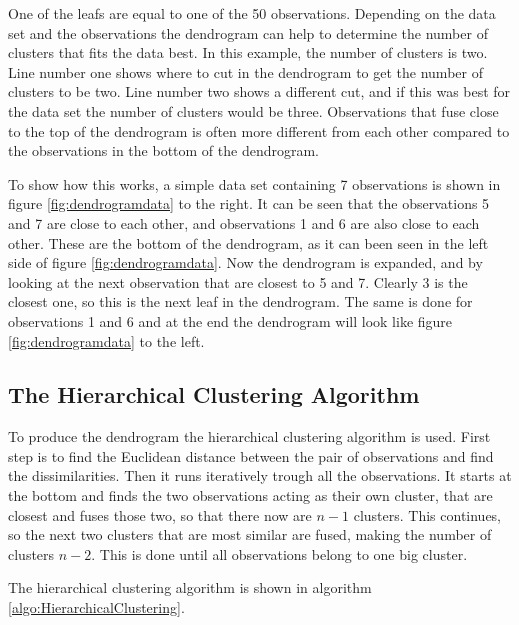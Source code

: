 One of the leafs are equal to one of the 50 observations. 
Depending on the data set and the observations the dendrogram can help to determine the number of clusters that fits the data best. In this example, the number of clusters is two. Line number one shows where to cut in the dendrogram to get the number of clusters to be two. Line number two shows a different cut, and if this was best for the data set the number of clusters would be three.
Observations that fuse close to the top of the dendrogram is often more different from each other compared to the observations in the bottom of the dendrogram. 


\FloatBarrier
To show how this works, a simple data set containing 7 observations is shown in figure \ref{fig:dendrogramdata} to the right.
It can be seen that the observations 5 and 7 are close to each other, and observations 1 and 6 are also close to each other. These are the bottom of the dendrogram, as it can been seen in the left side of figure \ref{fig:dendrogramdata}. Now the dendrogram is expanded, and by looking at the next observation that are closest to 5 and 7. Clearly 3 is the closest one, so this is the next leaf in the dendrogram. The same is done for observations 1 and 6 and at the end the dendrogram will look like figure \ref{fig:dendrogramdata} to the left.


\FloatBarrier
\subsection{The Hierarchical Clustering Algorithm}
To produce the dendrogram the hierarchical clustering algorithm is used. First step is to find the Euclidean distance between the pair of observations and find the dissimilarities.
Then it runs iteratively trough all the observations. It starts at the bottom and finds the two observations acting as their own cluster, that are closest and fuses those two, so that there now are $n-1$ clusters. This continues, so the next two clusters that are most similar are fused, making the number of clusters $n-2$. This is done until all observations belong to one big cluster.

The hierarchical clustering algorithm is shown in algorithm \ref{algo:HierarchicalClustering}.

